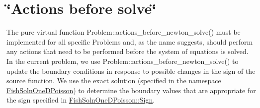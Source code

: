 \hypertarget{index_actions_before}{}\section{\char`\"{}\+Actions before solve\char`\"{}}\label{index_actions_before}
The pure virtual function {\ttfamily Problem\+::actions\+\_\+before\+\_\+newton\+\_\+solve()} must be implemented for all specific {\ttfamily Problems} and, as the name suggests, should perform any actions that need to be performed before the system of equations is solved. In the current problem, we use {\ttfamily Problem\+::actions\+\_\+before\+\_\+newton\+\_\+solve()} to update the boundary conditions in response to possible changes in the sign of the source function. We use the exact solution (specified in the namespace {\ttfamily \hyperlink{namespaceFishSolnOneDPoisson}{Fish\+Soln\+One\+D\+Poisson}}) to determine the boundary values that are appropriate for the sign specified in {\ttfamily \hyperlink{namespaceFishSolnOneDPoisson_a108e814ef887ffcc8caa7c65a7d30f06}{Fish\+Soln\+One\+D\+Poisson\+::\+Sign}}.


